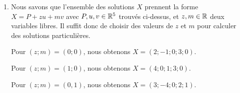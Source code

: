 {\begin{enumerate}
		Finalement, l'ensemble des solutions est un plan de $\R^5$ passant par le point $(2;-1;0;3;0)$ et dirigé par les vecteurs $\begin{pmatrix}2\\1\\1\\0\\0\end{pmatrix}$ et $\begin{pmatrix}1\\-3\\0\\-1\\1\end{pmatrix}$.
		\item
		Nous savons que l'ensemble des solutions $X$ prennent la forme $X = P + zu + mv$ avec $P, u, v\in\mathbb{R}^5$ trouvés ci-dessus, et $z, m\in\mathbb{R}$ deux variables libres.
		Il suffit donc de choisir des valeurs de $z$ et $m$ pour calculer des solutions particulières.
		
		Pour $(z;m) = (0;0)$, nous obtenons $X = (2;-1;0;3;0)$.
		
		Pour $(z;m) = (1;0)$, nous obtenons $X=(4;0;1;3;0)$.
		
		Pour $(z;m) = (0,1)$, nous obtenons $X=(3;-4;0;2;1)$.
	\end{enumerate}
}

